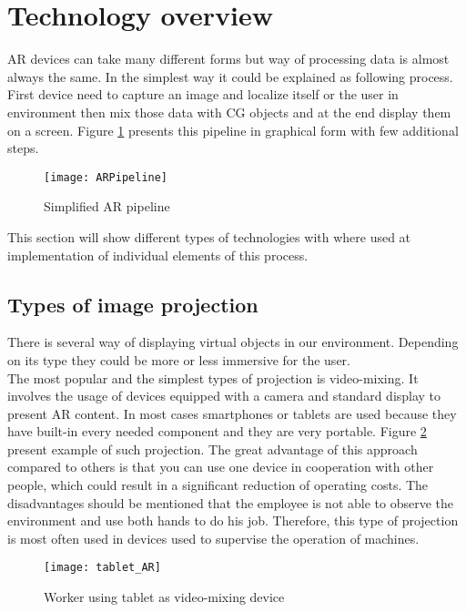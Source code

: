 \documentclass[printmode,en]{mgr}
\begin{document}
\section{Technology overview}
AR devices can take many different forms but way of processing data is almost always the same. In the simplest way it could be explained as following process. First device need to capture an image and localize itself or the user in environment then mix those data with CG objects and at the end display them on a screen. Figure \ref{fig:ARpipeline} presents this pipeline in graphical form with few additional steps.

\begin{figure}[!ht]
  \centering
    \texttt{[image: ARPipeline]}
  \caption{Simplified AR pipeline}
  \label{fig:ARpipeline}
\end{figure}

This section will show different types of technologies with where used at implementation of individual elements of this process.

\subsection{Types of image projection}
There is several way of displaying virtual objects in our environment. Depending on its type they could be more or less immersive for the user.\\

The most popular and the simplest types of projection is video-mixing. It involves the usage of devices equipped with a camera and standard display to present AR content. In most cases smartphones or tablets are used because they have built-in every needed component and they are very portable. Figure \ref{fig:tabletAR} present example of such projection. The great advantage of this approach compared to others is that you can use one device in cooperation with other people, which could result in a significant reduction of operating costs. The disadvantages should be mentioned that the employee is not able to observe the environment and use both hands to do his job. Therefore, this type of projection is most often used in devices used to supervise the operation of machines.

\begin{figure}[!ht]
  \centering
    \texttt{[image: tablet\_AR]}
  \caption{Worker using tablet as video-mixing device}
  \label{fig:tabletAR}
\end{figure}
\end{document}
